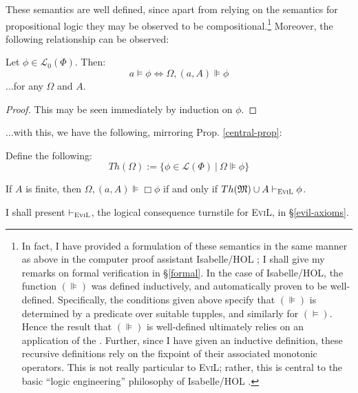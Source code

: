These semantics are well defined, since apart from relying on the semantics
for propositional logic they may be observed to be compositional.{\footnote{In
fact, I have provided a formulation of these semantics in the same manner as
above in the computer proof assistant Isabelle/HOL \citep{nipkow_isabelle/hol:proof_2002}; I shall
give my remarks on formal verification in \S\ref{formal}.  In the case of
Isabelle/HOL, the function $(\VDash)$ was defined inductively, and
automatically proven to be well-defined.  Specifically, the conditions given
above specify that $(\VDash)$ is determined by a 
predicate over suitable tupples, and similarly for $(\models)$.  Hence the
result that $(\VDash)$ is well-defined ultimately relies on an application of
the  \citep[chapter 12]{roman_lattices_2008}. Further,
since I have given an inductive definition, these recursive definitions rely
on the {} fixpoint of their associated monotonic
operators.  This is not really particular to \textsc{EviL}; rather, this is
central to the basic ``logic engineering'' philosophy of Isabelle/HOL \citep{berghofer_meta-theory_2009}.}} 
Moreover, the following relationship can be observed:

\begin{lemma}[Truthiness]\label{truthiness}
  Let $\phi \in \mathcal{L}_0 (\Phi)$.  Then:
  \[ a \models \phi \Longleftrightarrow \Omega, (a, A) \VDash \phi \]
  $\ldots$for any $\Omega$ and $A$.
\end{lemma}
\begin{proof}
  This may be seen immediately by induction on $\phi$.
\end{proof}

$\ldots$with this, we have the following, mirroring Prop. \ref{central-prop}:
\begin{definition}  Define the following:
 $$Th(\Omega) := \{ \phi \in \mathcal{L}(\Phi) \ |\ \Omega \VDash \phi \}$$
\end{definition}

\begin{theorem}\label{theorem-theorem}
  If $A$ is finite, then $\Omega, (a,A) \VDash \Box \phi$ if and only if $Th(\Omega) \cup A \vdash_{\text{\textsc{EviL}}} \phi$.
\end{theorem}

I shall present $\vdash_{\text{\textsc{EviL}}}$, the logical consequence turnstile for \textsc{EviL}, in \S\ref{evil-axioms}.

